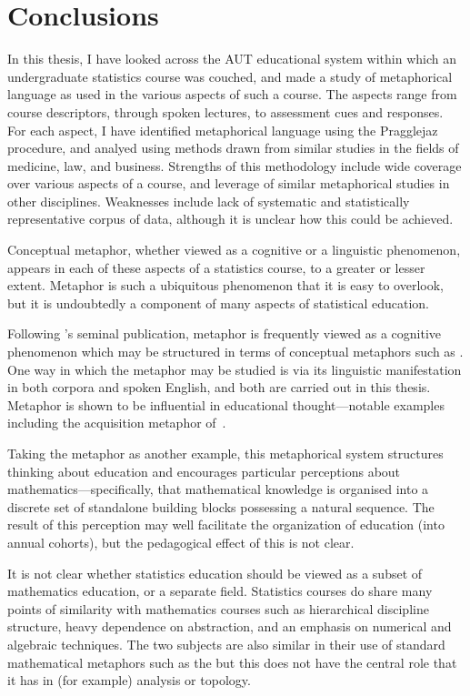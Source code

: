 \chapter{Conclusions}
\label{chapter8}

In this thesis, I have looked across the AUT educational system within
which an undergraduate statistics course was couched, and made a study
of metaphorical language as used in the various aspects of such a
course.  The aspects range from course descriptors, through spoken
lectures, to assessment cues and responses.  For each aspect, I have
identified metaphorical language using the Pragglejaz procedure, and
analyed using methods drawn from similar studies in the fields of
medicine, law, and business.  Strengths of this methodology include
wide coverage over various aspects of a course, and leverage of
similar metaphorical studies in other disciplines.  Weaknesses include
lack of systematic and statistically representative corpus of data,
although it is unclear how this could be achieved.

Conceptual metaphor, whether viewed as a cognitive or a linguistic
phenomenon, appears in each of these aspects of a statistics course,
to a greater or lesser extent.  Metaphor is such a ubiquitous
phenomenon that it is easy to overlook, but it is undoubtedly a
component of many aspects of statistical education.

Following \citeauthor{lakoff1980}'s seminal publication, metaphor is
frequently viewed as a cognitive phenomenon which may be structured in
terms of conceptual metaphors such as .  One
way in which the metaphor may be studied is via its linguistic
manifestation in both corpora and spoken English, and both are carried
out in this thesis.  Metaphor is shown to be influential in
educational thought---notable examples including the acquisition
metaphor of~.

Taking the  metaphor as another example, this
metaphorical system structures thinking about education and encourages
particular perceptions about mathematics---specifically, that
mathematical knowledge is organised into a discrete set of standalone
building blocks possessing a natural sequence.  The result of this
perception may well facilitate the organization of education (into
annual cohorts), but the pedagogical effect of this is not clear.

It is not clear whether statistics education should be viewed as a
subset of mathematics education, or a separate field.  Statistics
courses do share many points of similarity with mathematics courses
such as hierarchical discipline structure, heavy dependence on
abstraction, and an emphasis on numerical and algebraic techniques.
The two subjects are also similar in their use of standard
mathematical metaphors such as the 
but this does not have the central role that it has in (for example)
analysis or topology.

